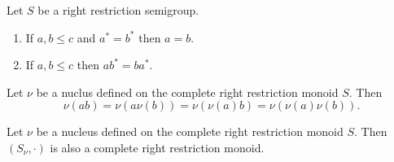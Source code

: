 \documentclass[10pt,a4paper]{amsart}
\begin{document}
\begin{lemma}\label{lem:spiked} Let $S$ be a right restriction semigroup. 
\begin{enumerate}

\item If $a,b \leq c$ and $a^{\ast} = b^{\ast}$ then $a = b$.

\item If $a,b \leq c$ then $ab^{\ast} = ba^{\ast}$.

\end{enumerate}
\end{lemma}

\begin{lemma}\label{lem:nucleus-properties} 
Let $\nu$ be a nuclus defined on the complete right restriction monoid $S$.
Then 
$$\nu (ab) = \nu (a \nu (b)) = \nu (\nu (a)b) = \nu (\nu (a) \nu (b)).$$
\end{lemma}

\begin{proposition}\label{prop:as} Let $\nu$ be a nucleus defined on the complete right restriction monoid $S$.
Then $(S_{\nu},\cdot)$ is also a complete right restriction monoid.
\end{proposition}
\end{document}

